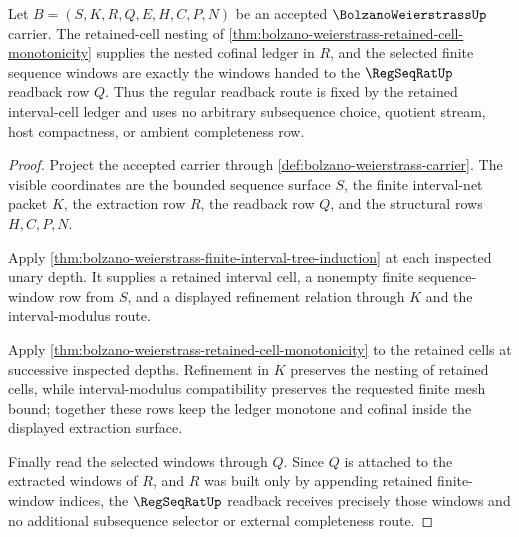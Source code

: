 \begin{theorem}
\label{thm:bolzano-weierstrass-cofinal-window-extraction}
Let $B=(S,K,R,Q,E,H,C,P,N)$ be an accepted $\BolzanoWeierstrassUp$ carrier. The retained-cell nesting of \autoref{thm:bolzano-weierstrass-retained-cell-monotonicity} supplies the nested cofinal ledger in $R$, and the selected finite sequence windows are exactly the windows handed to the $\RegSeqRatUp$ readback row $Q$. Thus the regular readback route is fixed by the retained interval-cell ledger and uses no arbitrary subsequence choice, quotient stream, host compactness, or ambient completeness row.
\end{theorem}
\begin{proof}
Project the accepted carrier through \autoref{def:bolzano-weierstrass-carrier}. The visible coordinates are the bounded sequence surface $S$, the finite interval-net packet $K$, the extraction row $R$, the readback row $Q$, and the structural rows $H,C,P,N$.

Apply \autoref{thm:bolzano-weierstrass-finite-interval-tree-induction} at each inspected unary depth. It supplies a retained interval cell, a nonempty finite sequence-window row from $S$, and a displayed refinement relation through $K$ and the interval-modulus route.

Apply \autoref{thm:bolzano-weierstrass-retained-cell-monotonicity} to the retained cells at successive inspected depths. Refinement in $K$ preserves the nesting of retained cells, while interval-modulus compatibility preserves the requested finite mesh bound; together these rows keep the ledger monotone and cofinal inside the displayed extraction surface.

Finally read the selected windows through $Q$. Since $Q$ is attached to the extracted windows of $R$, and $R$ was built only by appending retained finite-window indices, the $\RegSeqRatUp$ readback receives precisely those windows and no additional subsequence selector or external completeness route.
\end{proof}

